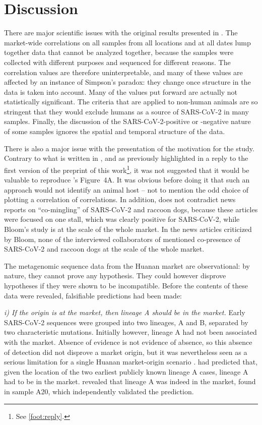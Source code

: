 \documentclass[11pt]{article}
\def \sct {\mbox{SARS-CoV-2}}
\begin{document}
\section{Discussion}
There are major scientific issues with the original results presented in \citet{Bloom2023VE}. The market-wide correlations on all samples from all locations and at all dates lump together data that cannot be analyzed together, because the samples were collected with different purposes and sequenced for different reasons. The correlation values are therefore uninterpretable, and many of these values are affected by an instance of Simpson's paradox: they change once structure in the data is taken into account. Many of the values put forward are actually not statistically significant. The criteria that are applied to non-human animals are so stringent that they would exclude humans as a source of \sct{} in many samples. Finally, the discussion of the \sct{}-positive or -negative nature of some samples ignores the spatial and temporal structure of the data.
  
There is also a major issue with the presentation of the motivation for the study. Contrary to what is written in \citet{Bloom2023VE}, and as previously highlighted in a reply to the first version of the preprint of this work\footnote{See \cref{foot:reply}.}, it was not suggested that it would be valuable to reproduce \citet{Liu2022RS}'s Figure~4A. It was obvious before doing it that such an approach would not identify an animal host -- not to mention the odd choice of plotting a correlation of correlations. In addition, \citet{Bloom2023VE} does not contradict news reports on ``co-mingling'' of SARS-CoV-2 and raccoon dogs, because these articles were focused on one stall, which was clearly positive for \sct{}, while Bloom's study is at the scale of the whole market. In the news articles criticized by Bloom, none of the interviewed collaborators of \citet{ACC2023Zenodo} mentioned co-presence of \sct{} and raccoon dogs at the scale of the whole market. 
 
The metagenomic sequence data from the Huanan market are observational: by nature, they cannot prove any hypothesis. They could however disprove hypotheses if they were shown to be incompatible. Before the contents of these data were revealed, falsifiable predictions had been made: 

\textit{i) If the origin is at the market, then lineage A should be in the market.}
Early SARS-CoV-2 sequences were grouped into two lineages, A and B, separated by two characteristic mutations. Initially however, lineage A had not been associated with the market. Absence of evidence is not evidence of absence, so this absence of detection did not disprove a market origin, but it was nevertheless seen as a serious limitation for a single Huanan market-origin scenario \citep{Zhang2020Nature, Bloom2021MBE}.  had predicted that, given the location of the two earliest publicly known lineage A cases, lineage A had to be in the market.  revealed that lineage A was indeed in the market, found in sample A20, which independently validated the prediction.
\end{document}
